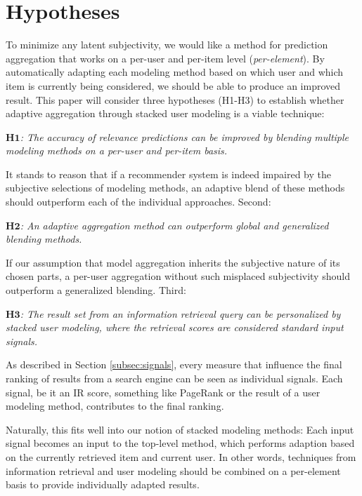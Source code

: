 \section{Hypotheses}

To minimize any latent subjectivity, we would like a method
for prediction aggregation that works on a per-user and per-item level (\emph{per-element}).
By automatically adapting each modeling method based on which user and which item is currently being
considered, we should be able to produce an improved result.
This paper will consider three hypotheses (H1-H3) 
to establish whether adaptive aggregation through stacked user modeling is a viable technique:

{
  \itshape
  $\mathbf{H1}$: The accuracy of relevance predictions can be improved
  by blending multiple modeling methods on a per-user and per-item basis.
}

It stands to reason that if a recommender system is indeed impaired
by the subjective selections of modeling methods,
an adaptive blend of these methods should outperform each of the individual approaches.
Second:

{
  \itshape
  $\mathbf{H2}$: An adaptive aggregation method can outperform global and generalized 
  blending methods.
}

If our assumption that model aggregation inherits the subjective nature of its chosen parts,
a per-user aggregation without such misplaced subjectivity should outperform a
generalized blending.
Third:

{
  \itshape
  $\mathbf{H3}$: The result set from an information retrieval query
  can be personalized by stacked user modeling, where the retrieval scores are considered 
  standard input signals.
}

As described in Section \ref{subsec:signals},
every measure that influence the final ranking of results from a search engine
can be seen as individual signals. Each signal, be it an IR score,
something like PageRank or the result of a user modeling method,
contributes to the final ranking.

Naturally, this fits well into our notion of stacked modeling methods:
Each input signal becomes an input to the top-level method,
which performs adaption based on the currently retrieved item and current user.
In other words, techniques from information retrieval and user modeling
should be combined on a per-element basis to provide individually adapted results.

